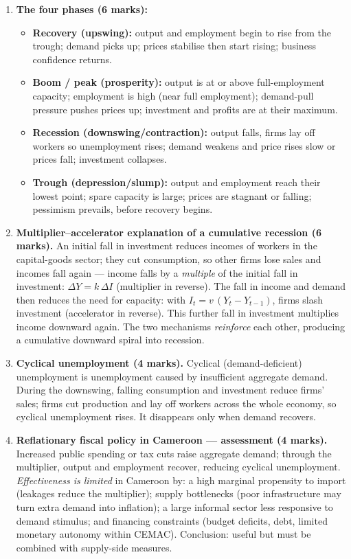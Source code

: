 \documentclass[11pt]{article}
\begin{document}
\begin{corrige}
\begin{enumerate}
\item \textbf{The four phases (6 marks):}
\begin{itemize}
\item \textbf{Recovery (upswing):} output and employment begin to rise from the trough; demand picks up; prices stabilise then start rising; business confidence returns.
\item \textbf{Boom / peak (prosperity):} output is at or above full-employment capacity; employment is high (near full employment); demand-pull pressure pushes prices up; investment and profits are at their maximum.
\item \textbf{Recession (downswing/contraction):} output falls, firms lay off workers so unemployment rises; demand weakens and price rises slow or prices fall; investment collapses.
\item \textbf{Trough (depression/slump):} output and employment reach their lowest point; spare capacity is large; prices are stagnant or falling; pessimism prevails, before recovery begins.
\end{itemize}
\item \textbf{Multiplier--accelerator explanation of a cumulative recession (6 marks).} An initial fall in investment reduces incomes of workers in the capital-goods sector; they cut consumption, so other firms lose sales and incomes fall again — income falls by a \emph{multiple} of the initial fall in investment: $\Delta Y = k\,\Delta I$ (multiplier in reverse). The fall in income and demand then reduces the need for capacity: with $I_t = v\,(Y_t - Y_{t-1})$, firms slash investment (accelerator in reverse). This further fall in investment multiplies income downward again. The two mechanisms \emph{reinforce} each other, producing a cumulative downward spiral into recession.
\item \textbf{Cyclical unemployment (4 marks).} Cyclical (demand-deficient) unemployment is unemployment caused by insufficient aggregate demand. During the downswing, falling consumption and investment reduce firms' sales; firms cut production and lay off workers across the whole economy, so cyclical unemployment rises. It disappears only when demand recovers.
\item \textbf{Reflationary fiscal policy in Cameroon — assessment (4 marks).} Increased public spending or tax cuts raise aggregate demand; through the multiplier, output and employment recover, reducing cyclical unemployment. \emph{Effectiveness is limited} in Cameroon by: a high marginal propensity to import (leakages reduce the multiplier); supply bottlenecks (poor infrastructure may turn extra demand into inflation); a large informal sector less responsive to demand stimulus; and financing constraints (budget deficits, debt, limited monetary autonomy within CEMAC). Conclusion: useful but must be combined with supply-side measures.
\end{enumerate}
\end{corrige}
\end{document}
